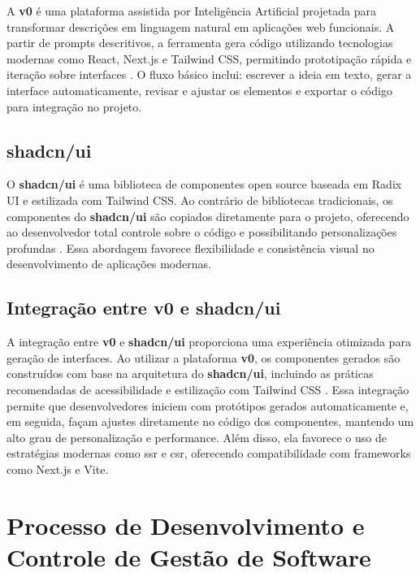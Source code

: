 A \textbf{v0} é uma plataforma assistida por Inteligência Artificial projetada para transformar descrições em linguagem natural em aplicações web funcionais. A partir de prompts descritivos, a ferramenta gera código utilizando tecnologias modernas como React, Next.js e Tailwind CSS, permitindo prototipação rápida e iteração sobre interfaces \cite{v0_docs}. O fluxo básico inclui: escrever a ideia em texto, gerar a interface automaticamente, revisar e ajustar os elementos e exportar o código para integração no projeto.

\subsection{shadcn/ui}
\label{subsec:shadcn}

O \textbf{shadcn/ui} é uma biblioteca de componentes open source baseada em Radix UI e estilizada com Tailwind CSS. Ao contrário de bibliotecas tradicionais, os componentes do \textbf{shadcn/ui} são copiados diretamente para o projeto, oferecendo ao desenvolvedor total controle sobre o código e possibilitando personalizações profundas \cite{shadcn_docs}. Essa abordagem favorece flexibilidade e consistência visual no desenvolvimento de aplicações modernas.

\subsection{Integração entre v0 e shadcn/ui}
\label{subsec:integracao-v0-shadcn}

A integração entre \textbf{v0} e \textbf{shadcn/ui} proporciona uma experiência otimizada para geração de interfaces. Ao utilizar a plataforma \textbf{v0}, os componentes gerados são construídos com base na arquitetura do \textbf{shadcn/ui}, incluindo as práticas recomendadas de acessibilidade e estilização com Tailwind CSS \cite{v0_docs, shadcn_docs}. Essa integração permite que desenvolvedores iniciem com protótipos gerados automaticamente e, em seguida, façam ajustes diretamente no código dos componentes, mantendo um alto grau de personalização e performance. Além disso, ela favorece o uso de estratégias modernas como \acrshort{ssr} e \acrshort{csr}, oferecendo compatibilidade com frameworks como Next.js e Vite.




\section{Processo de Desenvolvimento e Controle de Gestão de Software}
\label{sec:git-github}

